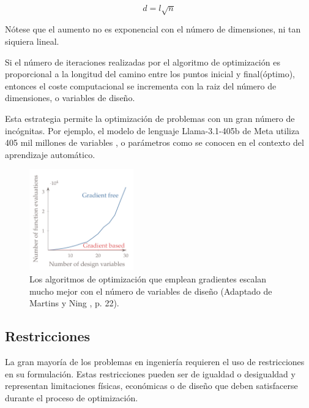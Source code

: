 \begin{equation}
	d = l\sqrt{n}
\end{equation}

Nótese que el aumento no es exponencial con el número de dimensiones, ni tan
siquiera lineal.

Si el número de iteraciones realizadas por el algoritmo de optimización es
proporcional a la longitud del camino entre los puntos inicial y final(óptimo),
entonces el coste computacional se incrementa con la raiz del número de
dimensiones, o variables de diseño.

Esta estrategia permite la optimización de problemas con un gran número de
incógnitas. Por ejemplo, el modelo de lenguaje Llama-3.1-405b de Meta utiliza
405 mil millones de variables \cite{dubey2024llama}, o parámetros como se
conocen en el contexto del aprendizaje automático.

\begin{figure}[h]
    \centering
    \includegraphics[width=0.4\textwidth]{./capitulos/metodologia/images/gradient_based_vs_gradient_free.png}
    \caption{Los algoritmos de optimización que emplean gradientes escalan mucho mejor con el número de variables de diseño (Adaptado de Martins y Ning \cite{mdobook}, p. 22).}
    \label{fig:gradient_based_vs_gradient_free}
\end{figure}


\subsection{Restricciones}

La gran mayoría de los problemas en ingeniería requieren el uso de
restricciones en su formulación. Estas restricciones pueden ser de igualdad o
desigualdad y representan limitaciones físicas, económicas o de diseño que
deben satisfacerse durante el proceso de optimización.
